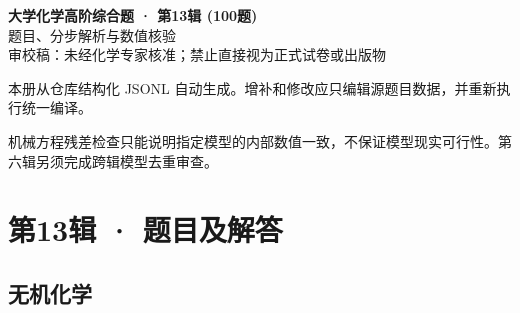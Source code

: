\documentclass[UTF8,11pt,a4paper]{ctexart}
\begin{document}
\begin{center}
{\LARGE\bfseries 大学化学高阶综合题 · 第13辑 (100题)}\\[0.8em]
{\large 题目、分步解析与数值核验}\\[0.5em]
{\small \textcolor{red!65!black}{审校稿：未经化学专家核准；禁止直接视为正式试卷或出版物}}
\end{center}
\vspace{1em}
\noindent 本册从仓库结构化 JSONL 自动生成。增补和修改应只编辑源题目数据，并重新执行统一编译。
\par 机械方程残差检查只能说明指定模型的内部数值一致，不保证模型现实可行性。第六辑另须完成跨辑模型去重审查。
\tableofcontents
\clearpage
\section*{第13辑 · 题目及解答}
\subsection*{无机化学}
\end{document}
